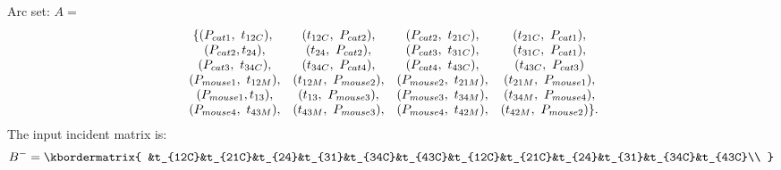 \documentclass[11pt]{article}
\begin{document}
\begin{flushleft}
	Arc set: $A=$
	\begin{equation*}
	\begin{array}{*{4}c}
	\{(P_{cat1},\ t_{12C}), & (t_{12C},\ P_{cat2}), & (P_{cat2},\ t_{21C}), & (t_{21C},\ P_{cat1}),\\
	\ (P_{cat2}, t_{24}), & (t_{24},\ P_{cat2}), & (P_{cat3},\ t_{31C}), & (t_{31C},\ P_{cat1}),\\
	\ (P_{cat3},\ t_{34C}), & (t_{34C},\ P_{cat4}), & (P_{cat4},\ t_{43C}), & (t_{43C},\ P_{cat3})\\
	\ (P_{mouse1},\ t_{12M}), & (t_{12M},\ P_{mouse2}), & (P_{mouse2},\ t_{21M}), & (t_{21M},\ P_{mouse1}),\\
	\ (P_{mouse1}, t_{13}), & (t_{13},\ P_{mouse3}), & (P_{mouse3},\ t_{34M}), & (t_{34M},\ P_{mouse4}),\\
	\ (P_{mouse4},\ t_{43M}), & (t_{43M},\ P_{mouse3}), & (P_{mouse4},\ t_{42M}), & (t_{42M},\ P_{mouse2})\}.
	\end{array}
	\end{equation*}	
%	
%
%
%
%
The input incident matrix is:
	\begin{equation*}
	B^-=
	\kbordermatrix{
	&t_{12C}&t_{21C}&t_{24}&t_{31}&t_{34C}&t_{43C}&t_{12C}&t_{21C}&t_{24}&t_{31}&t_{34C}&t_{43C}\\
}
\end{equation*}
\end{flushleft}
\end{document}

